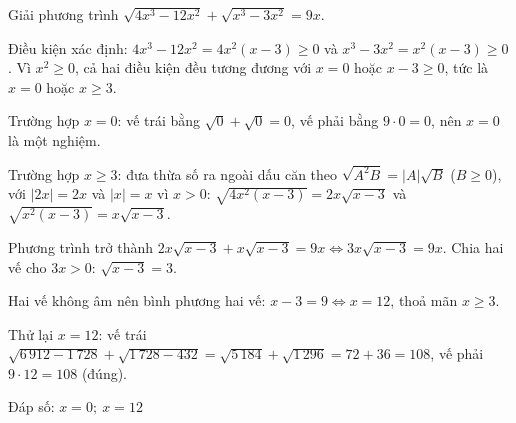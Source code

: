\begin{problem}[9DS-CAN-026]
Giải phương trình $\sqrt{4x^3 - 12x^2} + \sqrt{x^3 - 3x^2} = 9x$.

\begin{solution}
Điều kiện xác định: $4x^3 - 12x^2 = 4x^2(x - 3) \geq 0$ và $x^3 - 3x^2 = x^2(x - 3) \geq 0$. Vì $x^2 \geq 0$, cả hai điều kiện đều tương đương với $x = 0$ hoặc $x - 3 \geq 0$, tức là $x = 0$ hoặc $x \geq 3$.

Trường hợp $x = 0$: vế trái bằng $\sqrt{0} + \sqrt{0} = 0$, vế phải bằng $9 \cdot 0 = 0$, nên $x = 0$ là một nghiệm.

Trường hợp $x \geq 3$: đưa thừa số ra ngoài dấu căn theo $\sqrt{A^2B} = |A|\sqrt{B}$ ($B \geq 0$), với $|2x| = 2x$ và $|x| = x$ vì $x > 0$: $\sqrt{4x^2(x - 3)} = 2x\sqrt{x - 3}$ và $\sqrt{x^2(x - 3)} = x\sqrt{x - 3}$.

Phương trình trở thành $2x\sqrt{x - 3} + x\sqrt{x - 3} = 9x \Leftrightarrow 3x\sqrt{x - 3} = 9x$. Chia hai vế cho $3x > 0$: $\sqrt{x - 3} = 3$.

Hai vế không âm nên bình phương hai vế: $x - 3 = 9 \Leftrightarrow x = 12$, thoả mãn $x \geq 3$.

Thử lại $x = 12$: vế trái $\sqrt{6\,912 - 1\,728} + \sqrt{1\,728 - 432} = \sqrt{5\,184} + \sqrt{1\,296} = 72 + 36 = 108$, vế phải $9 \cdot 12 = 108$ (đúng).

Đáp số: $\boxed{x = 0;\ x = 12}$
\end{solution}
\end{problem}

